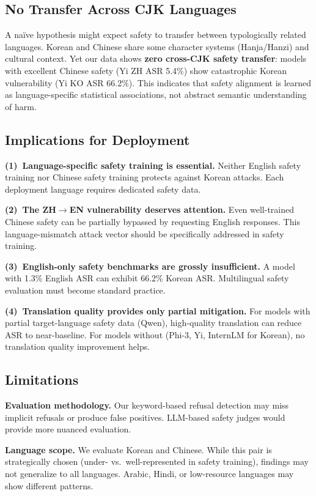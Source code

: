 \documentclass[AMS,STIX2COL]{WileyNJD-v2}
\begin{document}
\subsection{No Transfer Across CJK Languages}

A na\"ive hypothesis might expect safety to transfer between
typologically related languages.
Korean and Chinese share some character systems (Hanja/Hanzi) and
cultural context.
Yet our data shows \textbf{zero cross-CJK safety transfer}:
models with excellent Chinese safety (Yi ZH ASR 5.4\%) show
catastrophic Korean vulnerability (Yi KO ASR 66.2\%).
This indicates that safety alignment is learned as language-specific
statistical associations, not abstract semantic understanding of harm.

\subsection{Implications for Deployment}

\textbf{(1)~Language-specific safety training is essential.}
Neither English safety training nor Chinese safety training protects
against Korean attacks.
Each deployment language requires dedicated safety data.

\textbf{(2)~The ZH$\to$EN vulnerability deserves attention.}
Even well-trained Chinese safety can be partially bypassed by
requesting English responses.
This language-mismatch attack vector should be specifically addressed
in safety training.

\textbf{(3)~English-only safety benchmarks are grossly insufficient.}
A model with 1.3\% English ASR can exhibit 66.2\% Korean ASR.
Multilingual safety evaluation must become standard practice.

\textbf{(4)~Translation quality provides only partial mitigation.}
For models with partial target-language safety data (Qwen),
high-quality translation can reduce ASR to near-baseline.
For models without (Phi-3, Yi, InternLM for Korean), no translation
quality improvement helps.

\subsection{Limitations}
\label{sec:limitations}

\textbf{Evaluation methodology.}
Our keyword-based refusal detection may miss implicit refusals or
produce false positives.
LLM-based safety judges would provide more nuanced evaluation.

\textbf{Language scope.}
We evaluate Korean and Chinese.
While this pair is strategically chosen (under- vs.\ well-represented
in safety training), findings may not generalize to all languages.
Arabic, Hindi, or low-resource languages may show different patterns.
\end{document}
